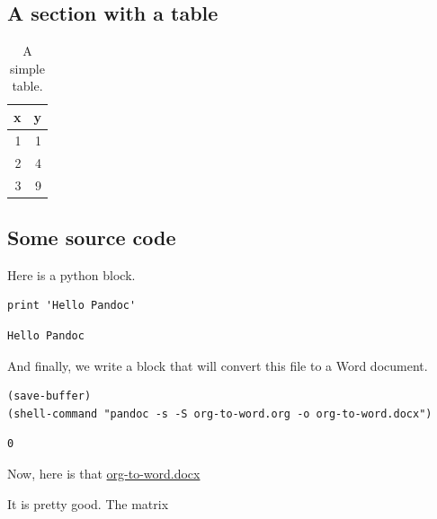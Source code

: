 \documentclass[11pt]{article}
\begin{document}
\subsection{A section with a table}
\label{sec-1-3}

\begin{table}[htb]
\caption{A simple table.}
\centering
\begin{tabular}{rr}
x & y\\
\hline
1 & 1\\
2 & 4\\
3 & 9\\
\end{tabular}
\end{table}


\subsection{Some source code}
\label{sec-1-4}

Here is a python block.

\begin{verbatim}
print 'Hello Pandoc'
\end{verbatim}

\begin{verbatim}
Hello Pandoc
\end{verbatim}

And finally, we write a block that will convert this file to a Word document.

\begin{verbatim}
(save-buffer)
(shell-command "pandoc -s -S org-to-word.org -o org-to-word.docx")
\end{verbatim}

\begin{verbatim}
0
\end{verbatim}

Now, here is that \url{org-to-word.docx}

It is pretty good. The matrix


\end{document}
